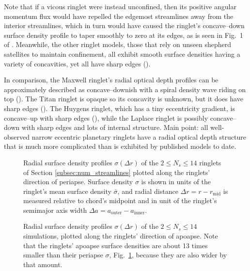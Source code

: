\documentclass[preprint]{aastex62}
\begin{document}
Note that if a vicous ringlet were instead unconfined, then its positive angular momentum flux
would have repelled the edgemost streamlines away from the interior streamlines, 
which in turn would have caused the ringlet's concave--down surface density profile
to taper smoothly to zero at its edges, as is seen in Fig.\ 1 of \cite{P81}.
Meanwhile, the other ringlet models, those that rely on unseen shepherd satellites to maintain confinement, all
exhibit smooth surface densities having a variety of concavities, yet all have sharp edges (\citealt{GT79, CG00, ME02}).

In comparison, the Maxwell ringlet's radial optical depth profiles can be approximately 
described as concave--downish with a spiral density wave riding on top (\citealt{Netal14}). The Titan
ringlet is opaque so its concavity is unknown, but it does have sharp edges (\citealt{Netal14}).
The Huygens ringlet, which has a tiny eccentricity gradient, is concave--up with sharp edges 
(\citealt{Fetal16}), while the Laplace ringlet is possibly concave--down with sharp edges
and lots of internal structure. Main point: all well-observed narrow eccentric planetary ringlets
have a radial optical depth structure that is much more complicated than is exhibited by
published models to date.

\begin{figure}
    \caption{
        \label{fig:periapse_sigma_vs_r_streamlines.pdf}
        Radial surface density profiles $\sigma(\Delta r)$ 
        of the $2\le N_s\le14$ ringlets of Section \ref{subsec:num_streamlines}
        plotted along the ringlets' direction of periapse.
        Surface density $\sigma$ is shown in units of the ringlet's mean surface density $\bar{\sigma}$,
        and radial distance $\Delta r = r - r_{\text{mid}}$ is measured relative to chord's midpoint
        and in unit of the ringlet's semimajor axis width $\Delta a=a_{\text{outer}}-a_{\text{inner}}$. 
    }
\end{figure}
\begin{figure}
    \caption{
        \label{fig:apoapse_sigma_vs_r_streamlines.pdf}
        Radial surface density profiles $\sigma(\Delta r)$ 
        of the $2\le N_s\le14$ simulations, plotted along the ringlets' direction of apoapse.
        Note that the ringlets' apoapse surface densities are about 13 times smaller
        than their periapse $\sigma$, Fig.\ \ref{fig:periapse_sigma_vs_r_streamlines.pdf},
        because they are also wider by that amount.
    }
\end{figure}
\end{document}
